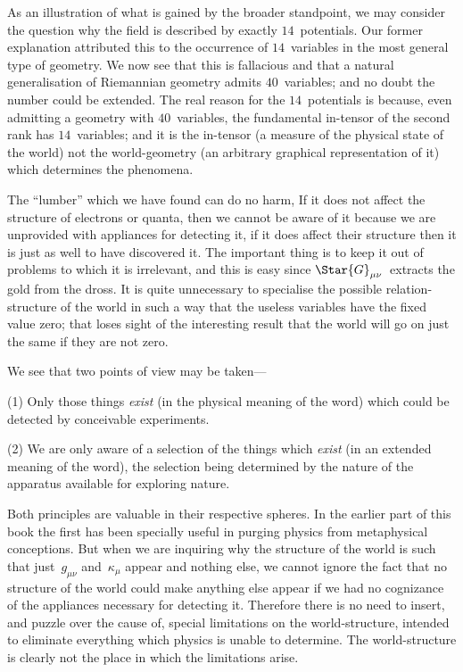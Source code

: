 \documentclass[12pt]{book}
\begin{document}
As an illustration of what is gained by the broader standpoint, we may
consider the question why the field is described by exactly $14$~potentials.
Our former explanation attributed this to the occurrence of $14$~variables in
the most general type of geometry. We now see that this is fallacious and
that a natural generalisation of Riemannian geometry admits $40$~variables;
and no doubt the number could be extended. The real reason for the $14$~potentials
is because, even admitting a geometry with $40$~variables, the
fundamental in-tensor of the second rank has $14$~variables; and it is the
in-tensor (a measure of the physical state of the world) not the world-geometry
(an arbitrary graphical representation of it) which determines the phenomena.

The ``lumber'' which we have found can do no harm, If it does not affect
the structure of electrons or quanta, then we cannot be aware of it because
we are unprovided with appliances for detecting it, if it does affect their
structure then it is just as well to have discovered it. The important thing
is to keep it out of problems to which it is irrelevant, and this is easy since
$\Star{G}_{\mu\nu}$~extracts the gold from the dross. It is quite unnecessary to specialise
the possible relation-structure of the world in such a way that the useless
variables have the fixed value zero; that loses sight of the interesting result
that the world will go on just the same if they are not zero.

We see that two points of view may be taken---

(1) Only those things \emph{exist} (in the physical meaning of the word) which
could be detected by conceivable experiments.

(2) We are only aware of a selection of the things which \emph{exist} (in an
extended meaning of the word), the selection being determined by the nature
of the apparatus available for exploring nature.

Both principles are valuable in their respective spheres. In the earlier
part of this book the first has been specially useful in purging physics from
metaphysical conceptions. But when we are inquiring why the structure of
the world is such that just~$g_{\mu\nu}$ and~$\kappa_{\mu}$ appear and nothing else, we cannot
ignore the fact that no structure of the world could make anything else
appear if we had no cognizance of the appliances necessary for detecting it.
Therefore there is no need to insert, and puzzle over the cause of, special
limitations on the world-structure, intended to eliminate everything which
physics is unable to determine. The world-structure is clearly not the place
in which the limitations arise.
\end{document}
